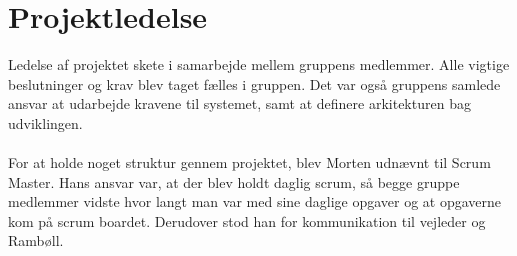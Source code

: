 \section{Projektledelse}
Ledelse af projektet skete i samarbejde mellem gruppens medlemmer. Alle vigtige beslutninger og krav blev taget fælles i gruppen.
Det var også gruppens samlede ansvar at udarbejde kravene til systemet, samt at definere arkitekturen bag udviklingen. \\ \\
For at holde noget struktur gennem projektet, blev Morten udnævnt til Scrum Master. Hans ansvar var, at der blev holdt daglig scrum, så begge gruppe medlemmer vidste hvor langt man var med sine daglige opgaver og at opgaverne kom på scrum boardet. Derudover stod han for kommunikation til vejleder og Rambøll. \\
